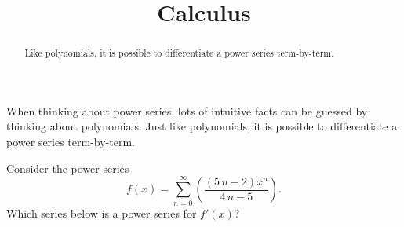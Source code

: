 \documentclass{ximera}
\title{Calculus}
\begin{document}
\begin{abstract}
  Like polynomials, it is possible to differentiate a power series term-by-term.
\end{abstract}

\maketitle

When thinking about power series, lots of intuitive facts can be guessed by thinking about polynomials.  Just like polynomials, it is possible to differentiate a power series term-by-term.


\begin{question}
  Consider the power series \[f(x) = \displaystyle\sum_{n=0}^\infty \left( \displaystyle\frac{{\left(5 \, n - 2\right)} x^{n}}{4 \, n - 5} \right).\]  Which series below is a power series for \(f'(x)\)?


\end{question}
\end{document}
